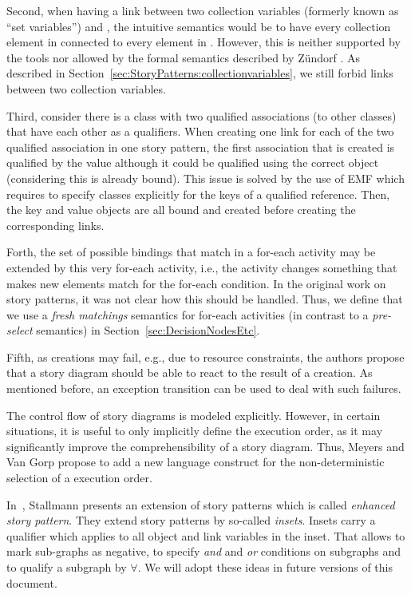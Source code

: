 Second, when having a link between two collection variables (formerly known as
``set variables'')  and , the intuitive semantics would be to
have every collection element in  connected to every element in 
. However, this is neither supported by the tools nor allowed by the formal semantics described by Z\"{u}ndorf \cite{Zun01}.
As described in Section~\ref{sec:StoryPatterns:collectionvariables}, we still
forbid links between two collection variables.

Third, consider there is a class with two qualified associations (to other classes) that have each other as a qualifiers.
When creating one link for each of the two qualified association in one story pattern, the first association that is created is qualified by the  value although it could be qualified using the correct object (considering this is already bound).
This issue is solved by the use of EMF which requires to specify  classes explicitly for the keys of a qualified reference.
Then, the key and value objects are all bound and created before creating the corresponding links.

Forth, the set of possible bindings that match in a for-each activity may be extended by this very for-each activity, i.e., the activity changes something that makes new elements match for the for-each condition. In the original work on story patterns, it was not clear how this should be handled.
Thus, we define that we use a \emph{fresh matchings} semantics for for-each activities (in contrast to a \emph{pre-select} semantics) in Section~\ref{sec:DecisionNodesEtc}.

Fifth, as creations may fail, e.g., due to resource constraints, the authors propose that a story diagram should be able to react to the result of a creation.
As mentioned before, an exception transition can be used to deal with such failures.

The control flow of story diagrams is modeled explicitly.
However, in certain situations, it is useful to only implicitly define the execution order, as it may significantly improve the comprehensibility of a story diagram.
Thus, Meyers and Van Gorp \cite{MG08} propose to add a new language construct for the non-deterministic selection of a execution order.

In~\cite{Sta08}, Stallmann presents an extension of story patterns which is called \emph{enhanced story pattern}. They extend story patterns by so-called \emph{insets}. Insets carry a qualifier which applies to all object and link variables in the inset. That allows to mark sub-graphs as negative, to specify \emph{and} and \emph{or} conditions on subgraphs and to qualify a subgraph by $\forall$. We will adopt these ideas in future versions of this document.

